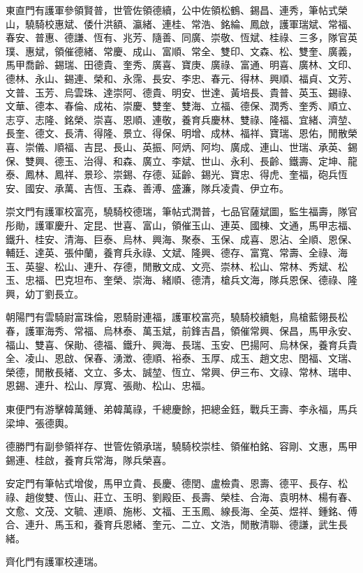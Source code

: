 \begin{pinyinscope}
東直門有護軍參領賢普，世管佐領德續，公中佐領松鶴、錫昌、連秀，筆帖式榮山，驍騎校惠斌、倭什洪額、瀛緒、連桂、常浩、銘綸、鳳啟，護軍瑞斌、常福、春安、普惠、德謙、恆有、兆芳、隨善、同廣、崇敬、恆斌、桂祿、三多，隊官英璞、惠斌，領催德緒、常慶、成山、富順、常全、雙印、文森、松、雙奎、廣義，馬甲喬齡、錫瑞、田德貴、奎秀、廣喜、寶庚、廣祿、富通、明喜、廣林、文印、德林、永山、錫連、榮和、永霈、長安、李忠、春元、得林、興順、福貞、文芳、文普、玉芳、烏雲珠、達崇阿、德貴、明安、世達、黃培長、貴普、英玉、錫祿、文華、德本、春倫、成祐、崇慶、雙奎、雙海、立福、德保、潤秀、奎秀、順立、志亨、志隆、銘榮、崇喜、恩順、連敬，養育兵慶林、雙祿、隆福、宜緒、濟堃、長奎、德文、長清、得隆、景立、得保、明增、成林、福祥、寶瑞、恩佑，閒散榮喜、崇儀、順福、吉昆、長山、英振、阿炳、阿均、廣成、連山、世瑞、承英、錫保、雙興、德玉、治得、和森、廣立、李斌、世山、永利、長齡、鐵壽、定坤、龍泰、鳳林、鳳祥、景珍、崇錫、存德、延齡、錫光、寶忠、得虎、奎福，砲兵恆安、國安、承萬、吉恆、玉森、善溥、盛濂，隊兵凌貴、伊立布。

崇文門有護軍校富亮，驍騎校德瑞，筆帖式潤普，七品官薩斌圖，監生福壽，隊官彤勛，護軍慶升、定昆、世喜、富山，領催玉山、連英、國棟、文通，馬甲志福、鐵升、桂安、清海、巨泰、烏林、興海、聚泰、玉保、成喜、恩沾、全順、恩保、輔廷、達英、張仲蘭，養育兵永祿、文斌、隆興、德存、富寬、常壽、全祿、海玉、英鋆、松山、連升、存德，閒散文成、文亮、崇林、松山、常林、秀斌、松玉、忠福、巴克坦布、奎榮、崇海、緒順、德清，槍兵文海，隊兵恩保、德祿、隆興，幼丁劉長立。

朝陽門有雲騎尉富珠倫，恩騎尉連福，護軍校富亮，驍騎校續魁，鳥槍藍翎長松春，護軍海秀、常福、烏林泰、萬玉斌，前鋒吉昌，領催常興、保昌，馬甲永安、福山、雙喜、保勛、德福、鐵升、興海、長瑞、玉安、巴揚阿、烏林保，養育兵貴全、凌山、恩啟、保春、湧澂、德順、裕泰、玉厚、成玉、趙文忠、閏福、文瑞、榮德，閒散長緒、文立、多太、誠堃、恆立、常興、伊三布、文祿、常林、瑞申、恩錫、連升、松山、厚寬、張勛、松山、忠福。

東便門有游擊韓萬鍾、弟韓萬祿，千總慶餘，把總金鈺，戰兵王壽、李永福，馬兵梁坤、張德輿。

德勝門有副參領祥存、世管佐領承瑞，驍騎校崇桂、領催柏銘、容剛、文惠，馬甲錫連、桂啟，養育兵常海，隊兵榮喜。

安定門有筆帖式增俊，馬甲立貴、長慶、德閏、盧檢貴、恩壽、德平、長存、松祿、趙俊雙、恆山、莊立、玉明、劉殿臣、長壽、榮桂、合海、袁明林、楊有春、文愈、文茂、文毓、連順、施彬、文福、王玉鳳、線長海、全英、煜祥、鍾銘、傅合、連升、馬玉和，養育兵恩緒、奎元、二立、文浩，閒散清聯、德謙，武生長緒。

齊化門有護軍校連瑞。


\end{pinyinscope}
